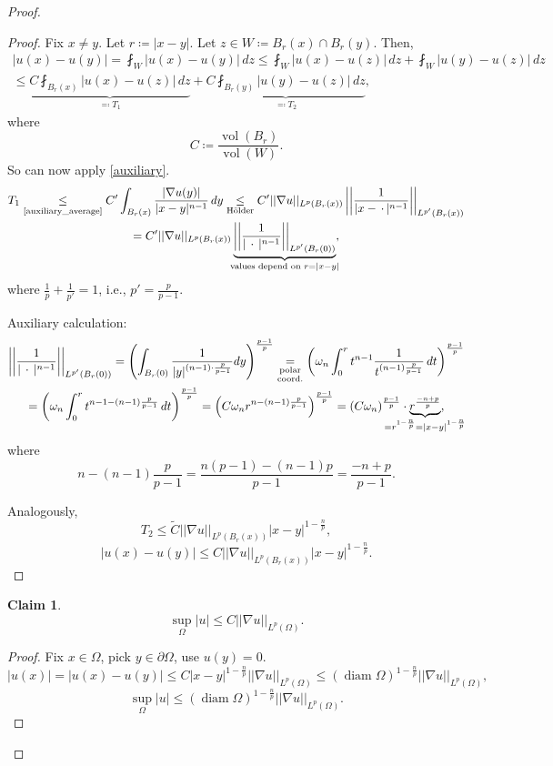 \documentclass[12pt]{article}
\DeclareMathOperator{\vol}{vol}
\DeclareMathOperator{\diam}{diam}
\theoremstyle{definition}
\newtheorem*{claim*}{Claim}
\begin{document}
\begin{proof}
\begin{enumerate}[label=\alph*)]
\begin{proof}
Fix $x\neq y$. Let $r\coloneqq|x-y|$. Let $z\in W\coloneqq B_r(x)\cap B_r(y)$. Then,
\begin{multline*}
\big|u(x)-u(y)\big|=\fint_W\big|u(x)-u(y)\big|\,dz\leq\fint_W\big|u(x)-u(z)\big|\,dz+\fint_W\big|u(y)-u(z)\big|\,dz\\
\leq\underbrace{C\fint_{B_r(x)}\big|u(x)-u(z)\big|\,dz}_{\eqqcolon T_1}+\underbrace{C\fint_{B_r(y)}\big|u(y)-u(z)\big|\,dz}_{\eqqcolon T_2},
\end{multline*}
where
\[C\coloneqq\frac{\vol(B_r)}{\vol(W)}.\]
So can now apply \eqref{auxiliary}.
\begin{multline*}
T_1\underset{\text{\eqref{auxiliary_average}}}\leq C'\int_{B_r(x)}\frac{|\nabla u(y)|}{|x-y|^{n-1}}\,dy\underset{\text{H\"older}}\leq C'||\nabla u||_{L^p(B_r(x))}\left|\left|\frac1{|x-\,\cdot\,|^{n-1}}\right|\right|_{L^{p'}(B_r(x))}\\
=C'||\nabla u||_{L^p(B_r(x))}\underbrace{\left|\left|\frac1{|\,\cdot\,|^{n-1}}\right|\right|_{L^{p'}(B_r(0))}}_{\mathclap{\text{values depend on }r=|x-y|}},
\end{multline*}
where $\frac1p+\frac1{p'}=1$, i.e., $p'=\frac p{p-1}$.

Auxiliary calculation:
\begin{multline*}
\left|\left|\frac1{|\,\cdot\,|^{n-1}}\right|\right|_{L^{p'}(B_r(0))}=\left(\int_{B_r(0)}\frac1{|y|^{(n-1)\cdot\frac p{p-1}}}dy\right)^{\frac{p-1}p}\underset{\substack{\text{polar}\\\text{coord.}}}=\left(\omega_n\int_0^rt^{n-1}\frac1{t^{(n-1)\frac p{p-1}}}\,dt\right)^{\frac{p-1}p}\\
=\left(\omega_n\int_0^rt^{n-1-(n-1)\frac p{p-1}}\,dt\right)^{\frac{p-1}p}=\left(C\omega_nr^{n-(n-1)\frac p{p-1}}\right)^{\frac{p-1}p}=(C\omega_n)^{\frac{p-1}p}\cdot\underbrace{r^{\frac{-n+p}p}}_{\mathclap{=r^{1-\frac np}=|x-y|^{1-\frac np}}},
\end{multline*}
where
\[n-(n-1)\frac p{p-1}=\frac{n(p-1)-(n-1)p}{p-1}=\frac{-n+p}{p-1}.\]

Analogously,
\[T_2\leq\widetilde C||\nabla u||_{L^p(B_r(x))}|x-y|^{1-\frac np},\]
\[\big|u(x)-u(y)\big|\leq C||\nabla u||_{L^p(B_r(x))}|x-y|^{1-\frac np}.\]
\end{proof}

\begin{claim*}
\[\sup_\Omega|u|\leq C||\nabla u||_{L^p(\Omega)}.\]
\end{claim*}

\begin{proof}
Fix $x\in\Omega$, pick $y\in\partial\Omega$, use $u(y)=0$.
\[|u(x)|=\big|u(x)-u(y)\big|\leq C|x-y|^{1-\frac np}||\nabla u||_{L^p(\Omega)}\leq(\diam\Omega)^{1-\frac np}||\nabla u||_{L^p(\Omega)},\]
\[\sup_\Omega|u|\leq(\diam\Omega)^{1-\frac np}||\nabla u||_{L^p(\Omega)}.\]
\end{proof}


\end{enumerate}
\end{proof}
\end{document}
